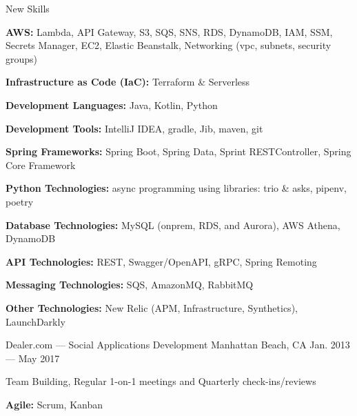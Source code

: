 \vspace{-2.00mm}
\begin{cventries}

\cventry
    {New Skills} %
    {} %
    {} %
    {} %
    {%
      \begin{cvitems} %
        \item {\textbf{AWS:} Lambda, API Gateway, S3, SQS, SNS, RDS, DynamoDB, IAM, SSM, Secrets Manager, EC2, Elastic Beanstalk, Networking (vpc, subnets, security groups)}
        \item {\textbf{Infrastructure as Code (IaC):} Terraform \& Serverless}
        \item {\textbf{Development Languages:} Java, Kotlin, Python}
        \item {\textbf{Development Tools:} IntelliJ IDEA, gradle, Jib, maven, git}
        \item {\textbf{Spring Frameworks:} Spring Boot, Spring Data, Sprint RESTController, Spring Core Framework}
        \item {\textbf{Python Technologies:} async programming using libraries: trio \& asks, pipenv, poetry}
        \item {\textbf{Database Technologies:} MySQL (onprem, RDS, and Aurora), AWS Athena, DynamoDB}
        \item {\textbf{API Technologies:} REST, Swagger/OpenAPI, gRPC, Spring Remoting}
        \item {\textbf{Messaging Technologies:} SQS, AmazonMQ, RabbitMQ}
        \item {\textbf{Other Technologies:} New Relic (APM, Infrastructure, Synthetics), LaunchDarkly}
      \end{cvitems}
    }


    {Dealer.com --- Social Applications Development} %
    {Manhattan Beach, CA} %
    {Jan. 2013 --- May 2017} %
    {}
    \vspace{-6.00mm}

    {} %
    {} %
    {} %
    {\vspace{-0.5mm}
      \begin{cvitems} %
        \item {Team Building, Regular 1-on-1 meetings and Quarterly check-ins/reviews}
        \item {\textbf{Agile:} Scrum, Kanban}
      \end{cvitems}
    }


\end{cventries}
